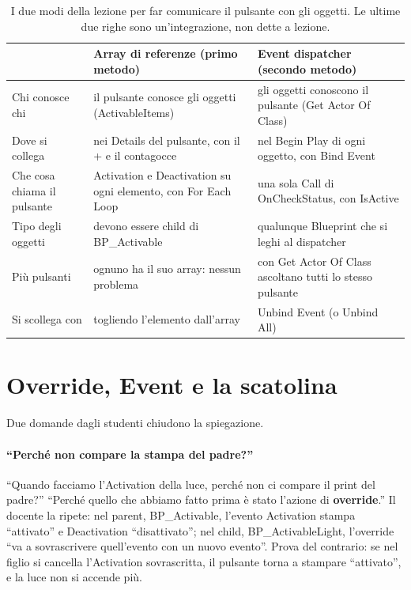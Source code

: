 \begin{table}[htbp]
\centering
\small
\begin{tabular}{@{}p{3.0cm}p{5.5cm}p{5.5cm}@{}}
\toprule
 & \textbf{Array di referenze (primo metodo)} & \textbf{Event dispatcher (secondo
metodo)} \\
\midrule
Chi conosce chi & il pulsante conosce gli oggetti (ActivableItems) & gli oggetti
conoscono il pulsante (Get Actor Of Class) \\
Dove si collega & nei Details del pulsante, con il + e il contagocce & nel Begin Play di
ogni oggetto, con Bind Event \\
Che cosa chiama il pulsante & Activation e Deactivation su ogni elemento, con For Each
Loop & una sola Call di OnCheckStatus, con IsActive \\
Tipo degli oggetti & devono essere child di BP\_Activable & qualunque Blueprint che si
leghi al dispatcher \\
Più pulsanti & ognuno ha il suo array: nessun problema & con Get Actor Of Class
ascoltano tutti lo stesso pulsante \\
Si scollega con & togliendo l'elemento dall'array & Unbind Event (o Unbind All) \\
\bottomrule
\end{tabular}
\caption{I due modi della lezione per far comunicare il pulsante con gli oggetti. Le
ultime due righe sono un'integrazione, non dette a lezione.}
\label{ue7:tab:metodi}
\end{table}

\section{Override, Event e la scatolina}
\label{ue7:sec:scatolina}

Due domande dagli studenti chiudono la spiegazione.

\paragraph{``Perché non compare la stampa del padre?''} ``Quando facciamo l'Activation
della luce, perché non ci compare il print del padre?'' ``Perché quello che abbiamo
fatto prima è stato l'azione di \textbf{override}.'' Il docente la ripete: nel parent,
BP\_Activable, l'evento Activation stampa ``attivato'' e Deactivation ``disattivato'';
nel child, BP\_ActivableLight, l'override ``va a sovrascrivere quell'evento con un nuovo
evento''. Prova del contrario: se nel figlio si cancella l'Activation sovrascritta, il
pulsante torna a stampare ``attivato'', e la luce non si accende più.


